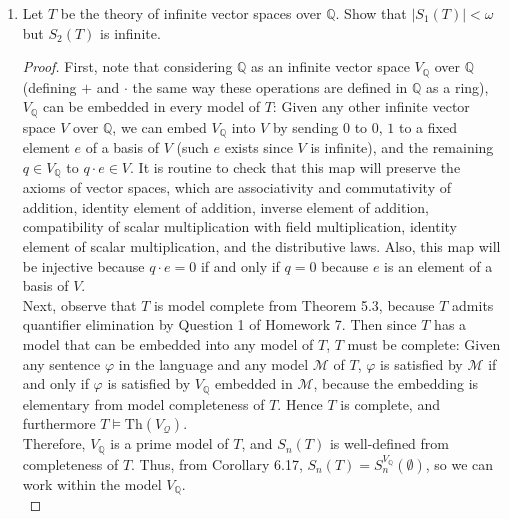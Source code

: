 \documentclass{article}
\begin{document}
\begin{enumerate}[label={\bf Q\arabic*:}]
  \item Let $T$ be the theory of infinite vector spaces over $\mathbb{Q}$.
    Show that $|S_1(T)|<\omega$ but $S_2(T)$ is infinite.

    \begin{proof}
      First, note that considering $\mathbb{Q}$ as an infinite vector space
      $V_\mathbb{Q}$ over $\mathbb{Q}$ (defining $+$ and $\cdot$ the same
      way these operations are defined in $\mathbb{Q}$ as a ring),
      $V_\mathbb{Q}$ can be embedded in every model of $T$: Given any other
      infinite vector space $V$ over $\mathbb{Q}$, we can embed
      $V_\mathbb{Q}$ into $V$ by sending $0$ to $0$, $1$ to a fixed element
      $e$ of a basis of $V$ (such $e$ exists since $V$ is infinite), and
      the remaining $q\in V_\mathbb{Q}$ to $q\cdot e\in V$. It is routine
      to check that this map will preserve the axioms of vector spaces,
      which are associativity and commutativity of addition, identity
      element of addition, inverse element of addition, compatibility of
      scalar multiplication with field multiplication, identity element of
      scalar multiplication, and the distributive laws. Also, this map will
      be injective because $q\cdot e=0$ if and only if $q=0$ because $e$ is
      an element of a basis of $V$. \\

      Next, observe that $T$ is model complete from Theorem 5.3, because
      $T$ admits quantifier elimination by Question 1 of Homework 7. Then
      since $T$ has a model that can be embedded into any model of $T$, $T$
      must be complete: Given any sentence $\varphi$ in the language and
      any model $\mathcal{M}$ of $T$, $\varphi$ is satisfied by
      $\mathcal{M}$ if and only if $\varphi$ is satisfied by
      $V_\mathbb{Q}$ embedded in $\mathcal{M}$, because the embedding is
      elementary from model completeness of $T$. Hence $T$ is complete, and
      furthermore $T\models\text{Th}(V_\mathcal{Q})$. \\

      Therefore, $V_\mathbb{Q}$ is a prime model of $T$, and $S_n(T)$ is
      well-defined from completeness of $T$. Thus, from Corollary 6.17,
      $S_n(T)= S_n^{V_{\mathbb{Q}}}(\emptyset)$, so we can work within the
      model $V_\mathbb{Q}$. \\


\end{proof}
\end{enumerate}
\end{document}
